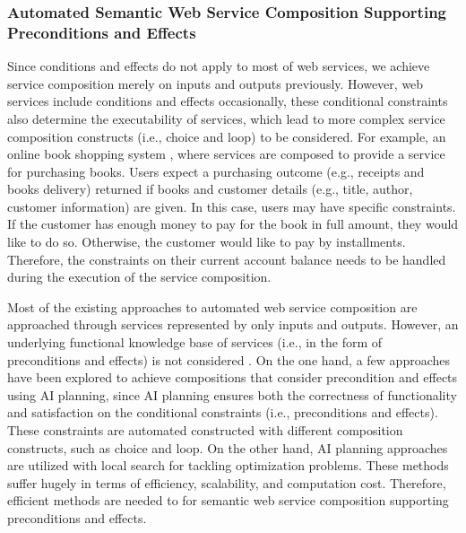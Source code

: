 \subsubsection{Automated Semantic Web Service Composition Supporting Preconditions and Effects}

Since conditions and effects do not apply to most of web services, we achieve service composition merely on inputs and outputs previously. However, web services include conditions and effects occasionally, these conditional constraints also determine the executability of services, which lead to more complex service composition constructs (i.e., choice and loop) to be considered. For example, an online book shopping system \cite{wang2014automated}, where services are composed to provide a service for purchasing books. Users expect a purchasing outcome (e.g., receipts and books delivery) returned if books and customer details (e.g., title, author, customer information) are given. In this case, users may have specific constraints. If the customer has enough money to pay for the book in full amount, they would like to do so. Otherwise, the customer would like to pay by installments. Therefore, the constraints on their current account balance needs to be handled during the execution of the service composition.

Most of the existing approaches to automated web service composition are approached through services represented by only inputs and outputs. However, an underlying functional knowledge base of services (i.e., in the form of preconditions and effects) is not considered \cite{paliwal2012semantics}. On the one hand, a few approaches \cite{bansal2016generalized,DBLP:journals/soca/BoustilMS14} have been explored to achieve compositions that consider precondition and effects using AI planning, since AI planning ensures both the correctness of functionality and satisfaction on the conditional constraints (i.e., preconditions and effects). These constraints are automated constructed with different composition constructs, such as choice and loop. On the other hand, AI planning approaches are utilized with local search for tackling optimization problems. These methods suffer hugely in terms of efficiency, scalability, and computation cost. Therefore, efficient methods are needed to for semantic web service composition supporting preconditions and effects.


 
